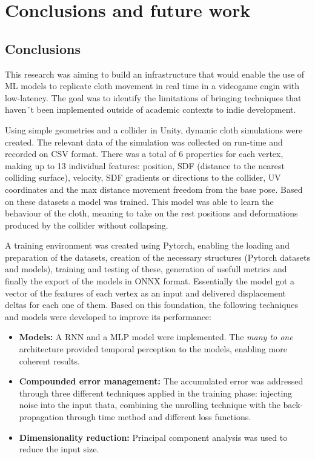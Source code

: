 \chapter*{Conclusions and future work}
\label{cap:conclusions}

\section*{Conclusions}
This research was aiming to build an infrastructure that would enable the use of ML models to replicate cloth movement in real time in a videogame engin with low-latency. The goal was to identify the limitations of bringing techniques that haven´t been implemented outside of academic contexts to indie development.\newline

Using simple geometries and a collider in Unity, dynamic cloth simulations were created. The relevant data of the simulation was collected on run-time and recorded on CSV format. There was a total of 6 properties for each vertex, making up to 13 individual features: position, SDF (distance to the nearest colliding surface), velocity, SDF gradients or directions to the collider, UV coordinates and the max distance movement freedom from the base pose. Based on these datasets a model was trained. This model was able to learn the behaviour of the cloth, meaning to take on the rest positions and deformations produced by the collider without collapsing. \newline

A training environment was created using Pytorch, enabling the loading and preparation of the datasets, creation of the necessary structures (Pytorch datasets and models), training and testing of these, generation of usefull metrics and finally the export of the models in ONNX format. Essentially the model got a vector of the features of each vertex as an input and delivered displacement deltas for each one of them. Based on this foundation, the following techniques and models were developed to improve its performance:
\begin{itemize}
    \item \textbf{Models:} A RNN and a MLP model were implemented. The \textit{many to one} architecture provided temporal perception to the models, enabling more coherent results.
    \item \textbf{Compounded error management:} The accumulated error was addressed through three different techniques applied in the training phase: injecting noise into the input thata, combining the unrolling technique with the back-propagation through time method and different loss functions.
    \item \textbf{Dimensionality reduction:} Principal component analysis was used to reduce the input size.
\end{itemize}

